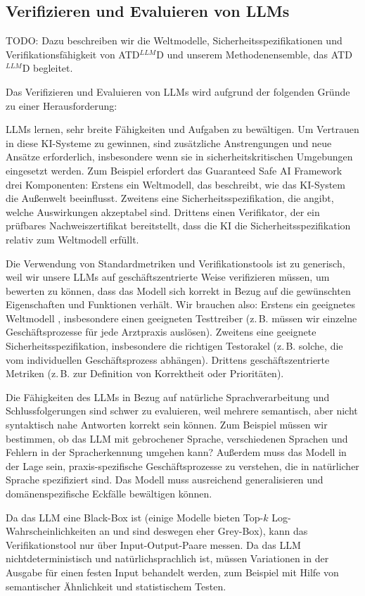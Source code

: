 \documentclass[twocolumn]{article}
\newcommand{\ATDLLMD}{ATD$^{LLM}$D}%
\begin{document}
\subsection{Verifizieren und Evaluieren von LLMs}
\label{sec:verifyandevaluatellms}

TODO: Dazu beschreiben wir die Weltmodelle, Sicherheitsspezifikationen und Verifikationsfähigkeit von \ATDLLMD{} und unserem Methodenensemble, das \ATDLLMD{} begleitet.

Das Verifizieren und Evaluieren von LLMs wird aufgrund der folgenden Gründe zu einer Herausforderung:
\begin{compactitem}
\item LLMs lernen, sehr breite Fähigkeiten und Aufgaben zu bewältigen. Um Vertrauen in diese KI-Systeme zu gewinnen, sind zusätzliche Anstrengungen und neue Ansätze erforderlich, insbesondere wenn sie in sicherheitskritischen Umgebungen eingesetzt werden. Zum Beispiel erfordert das Guaranteed Safe AI Framework \cite{Dalrymple24} drei Komponenten: Erstens ein Weltmodell, das beschreibt, wie das KI-System die Außenwelt beeinflusst. Zweitens eine Sicherheitsspezifikation, die angibt, welche Auswirkungen akzeptabel sind. Drittens einen Verifikator, der ein prüfbares Nachweiszertifikat bereitstellt, dass die KI die Sicherheitsspezifikation relativ zum Weltmodell erfüllt.
\item Die Verwendung von Standardmetriken und Verifikationstools \cite{Chang24} ist zu generisch, weil wir unsere LLMs auf geschäftszentrierte Weise verifizieren müssen, um bewerten zu können, dass das Modell sich korrekt in Bezug auf die gewünschten Eigenschaften und Funktionen verhält. Wir brauchen also: Erstens ein geeignetes Weltmodell \cite{Dalrymple24}, insbesondere einen geeigneten Testtreiber (z.\,B. müssen wir einzelne Geschäftsprozesse für jede Arztpraxis auslösen). Zweitens eine geeignete Sicherheitsspezifikation, insbesondere die richtigen Testorakel (z.\,B. solche, die vom individuellen Geschäftsprozess abhängen). Drittens geschäftszentrierte Metriken (z.\,B. zur Definition von Korrektheit oder Prioritäten).
\item Die Fähigkeiten des LLMs in Bezug auf natürliche Sprachverarbeitung und Schlussfolgerungen sind schwer zu evaluieren, weil mehrere semantisch, aber nicht syntaktisch nahe Antworten korrekt sein können. Zum Beispiel müssen wir bestimmen, ob das LLM mit gebrochener Sprache, verschiedenen Sprachen und Fehlern in der Spracherkennung umgehen kann? Außerdem muss das Modell in der Lage sein, praxis-spezifische Geschäftsprozesse zu verstehen, die in natürlicher Sprache spezifiziert sind. Das Modell muss ausreichend generalisieren und domänenspezifische Eckfälle bewältigen können.
\item Da das LLM eine Black-Box ist (einige Modelle bieten Top-$k$ Log-Wahrscheinlichkeiten an \cite{Vaswani17} und sind deswegen eher Grey-Box), kann das Verifikationstool nur über Input-Output-Paare messen. Da das LLM nichtdeterministisch und natürlichsprachlich ist, müssen Variationen in der Ausgabe für einen festen Input behandelt werden, zum Beispiel mit Hilfe von semantischer Ähnlichkeit und statistischem Testen.
\end{compactitem}
\end{document}
